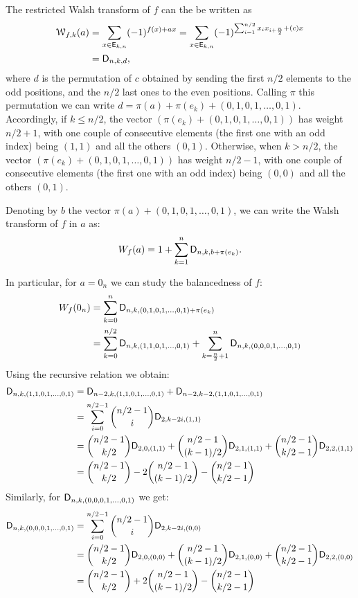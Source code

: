 \documentclass[11pt]{llncs}
\begin{document}
The restricted Walsh transform of $f$ can the be written as \begin{align*}
\mathcal{W}_{f,k}(a)&=\sum_{x \in \mathsf{E}_{k,n}} (-1)^{f(x)+ax}=\sum_{x \in \mathsf{E}_{k,n}} (-1)^{\sum_{i=1}^{n/2} x_i x_{i+\frac{n}{2}}+ (c)x}\\
&=\mathsf{D}_{n,k,d},
\end{align*}
where $d$ is the permutation of $c$ obtained by sending the first $n/2$ elements to the odd positions, and the $n/2$ last ones to the even positions. Calling $\pi$ this permutation we can write $d=\pi(a)+ \pi(e_k)+ (0,1,0,1,\ldots,0,1)$. 
Accordingly, if $k\le n/2$, the vector $(\pi(e_k)+ (0,1,0,1,\ldots,0,1))$ has weight $n/2+1$, with one couple of consecutive elements (the first one with an odd index) being $(1,1)$ and all the others $(0,1)$. 
Otherwise,  when $k> n/2$, the vector $(\pi(e_k)+ (0,1,0,1,\ldots,0,1))$ has weight $n/2-1$, with one couple of consecutive elements (the first one with an odd index) being $(0,0)$ and all the others $(0,1)$. 

Denoting by $b$ the vector $\pi(a)+(0,1,0,1,\ldots,0,1)$, we can write the Walsh transform of $f$ in $a$ as:
\begin{equation}\label{eqn:walsh_from_D}
    W_{f}(a)=1+\sum_{k=1}^n\mathsf{D}_{n,k,b+\pi(e_k)}.
\end{equation}

In particular, for $a=0_n$ we can study the balancedness of $f$:
\begin{align*}
W_{f}(0_n)&=\sum_{k=0}^n\mathsf{D}_{n,k,(0,1,0,1,\ldots,0,1)+\pi(e_k)}\\
&=\sum_{k=0}^{n/2}\mathsf{D}_{n,k,(1,1,0,1,\ldots,0,1)}+ \sum_{k=\frac{n}{2}+1}^{n}\mathsf{D}_{n,k,(0,0,0,1,\ldots,0,1)}
\end{align*}
Using the recursive relation we obtain:
\begin{align*}
\mathsf{D}_{n,k,(1,1,0,1,\ldots,0,1)}&= \mathsf{D}_{n-2,k,(1,1,0,1,\ldots,0,1)} + \mathsf{D}_{n-2,k-2,(1,1,0,1,\ldots,0,1)} \\
&=\sum_{i=0}^{n/2-1} \binom{n/2-1}{i} \mathsf{D}_{2,k-2i,(1,1)}\\
&=\binom{n/2-1}{k/2} \mathsf{D}_{2,0,(1,1)}+ \binom{n/2-1}{(k-1)/2} \mathsf{D}_{2,1,(1,1)}+ \binom{n/2-1}{k/2-1} \mathsf{D}_{2,2,(1,1)}\\
&=\binom{n/2-1}{k/2} -2 \binom{n/2-1}{(k-1)/2} - \binom{n/2-1}{k/2-1}\\
\end{align*}
Similarly, for $\mathsf{D}_{n,k,(0,0,0,1,\ldots,0,1)}$ we get:
\begin{align*}
\mathsf{D}_{n,k,(0,0,0,1,\ldots,0,1)}
&=\sum_{i=0}^{n/2-1} \binom{n/2-1}{i} \mathsf{D}_{2,k-2i,(0,0)}\\
&=\binom{n/2-1}{k/2} \mathsf{D}_{2,0,(0,0)}+ \binom{n/2-1}{(k-1)/2} \mathsf{D}_{2,1,(0,0)}+ \binom{n/2-1}{k/2-1} \mathsf{D}_{2,2,(0,0)}\\
&=\binom{n/2-1}{k/2} +2 \binom{n/2-1}{(k-1)/2} - \binom{n/2-1}{k/2-1}\\
\end{align*}
\end{document}
